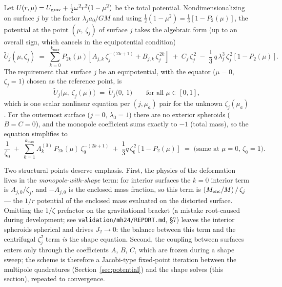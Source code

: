 \documentclass{aastex631}
\begin{document}
Let $U(r,\mu) = U_{\rm grav} + \tfrac{1}{2}\omega^2 r^2 (1-\mu^2)$ be
the total potential.  Nondimensionalizing on surface $j$ by the factor
$\lambda_j a_0 / GM$ and using
$\tfrac{1}{2}(1-\mu^2) = \tfrac{1}{3}\left[1 - P_2(\mu)\right]$, the
potential at the point $(\mu,\ \zeta_j)$ of surface $j$ takes the
algebraic form (up to an overall sign, which cancels in the
equipotential condition)
\begin{equation}
\widetilde{U}_j(\mu, \zeta_j) \;=\;
\sum_{k=0}^{k_{\max}} P_{2k}(\mu)
\left[ A_{j,k}\, \zeta_j^{-(2k+1)} + B_{j,k}\, \zeta_j^{\,2k} \right]
\;+\; C_j\, \zeta_j^{\,2}
\;-\; \frac{1}{3}\, q\, \lambda_j^3\, \zeta_j^{\,2}
\left[ 1 - P_2(\mu) \right].
\label{eq:Utilde}
\end{equation}
The requirement that surface $j$ be an equipotential, with the equator
($\mu = 0$, $\zeta_j = 1$) chosen as the reference point, is
\citep[][Eq.~51]{Hubbard2013}
\begin{equation}
\widetilde{U}_j\big(\mu,\ \zeta_j(\mu)\big) \;=\;
\widetilde{U}_j\big(0,\ 1\big)
\qquad \text{for all } \mu \in [0,1],
\label{eq:equipot}
\end{equation}
which is one scalar nonlinear equation per $(j, \mu_a)$ pair for the
unknown $\zeta_j(\mu_a)$.  For the outermost surface ($j=0$,
$\lambda_0 = 1$) there are no exterior spheroids ($B = C = 0$), and the
monopole coefficient sums exactly to $-1$ (total mass), so the equation
simplifies to \citep[][Eq.~50]{Hubbard2013}
\begin{equation}
\frac{1}{\zeta_0} \;+\;
\sum_{k=1}^{k_{\max}} A^{(0)}_k\, P_{2k}(\mu)\, \zeta_0^{-(2k+1)}
\;+\; \frac{1}{3} q\, \zeta_0^{\,2} \left[1 - P_2(\mu)\right]
\;=\; \text{(same at $\mu=0$, $\zeta_0=1$)} .
\label{eq:outer}
\end{equation}

Two structural points deserve emphasis.  First, the physics of the
deformation lives in the \emph{monopole-with-shape} term: for interior
surfaces the $k=0$ interior term is $A_{j,0}/\zeta_j$, and
$-A_{j,0}$ is the enclosed mass fraction, so this term is
$(M_{\rm enc}/M)\,/\,\zeta_j$ --- the $1/r$ potential of the enclosed
mass evaluated on the distorted surface.  Omitting the $1/\zeta$
prefactor on the gravitational bracket (a mistake root-caused during
development; see \texttt{validation/mh24/REPORT.md}, \S7) leaves the
interior spheroids spherical and drives $J_2 \to 0$: the balance between
this term and the centrifugal $\zeta_j^2$ term \emph{is} the shape
equation.  Second, the coupling between surfaces enters only through the
coefficients $A$, $B$, $C$, which are frozen during a shape sweep; the
scheme is therefore a Jacobi-type fixed-point iteration between the
multipole quadratures (Section~\ref{sec:potential}) and the shape solves
(this section), repeated to convergence.
\end{document}
